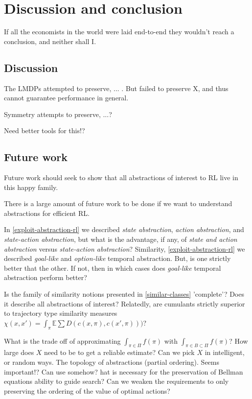 \chapter{Discussion and conclusion}\label{C:con}

If all the economists in the world were laid end-to-end they wouldn't
reach a conclusion, and neither shall I.


\section{Discussion}

The LMDPs attempted to preserve, ... . But failed to preserve X, and thus cannot guarantee performance in general.

Symmetry attempts to preserve, ...?

Need better tools for this!?


\section{Future work}

Future work should seek to show that all abstractions of interest to RL live in this happy family.

There is a large amount of future work to be done if we want to understand abstractions for efficient RL.

In \ref{exploit-abstraction-rl} we described \textit{state abstraction}, \textit{action abstraction}, and \textit{state-action abstraction}, but what is the advantage, if any, of \textit{state and action abstraction} versus \textit{state-action abstraction}? Similarity, \ref{exploit-abstraction-rl} we described \textit{goal-like} and \textit{option-like} temporal abstraction. But, is one strictly better that the other. If not, then in which cases does \textit{goal-like} temporal abstraction perform better?

Is the family of similarity notions presented in \ref{similar-classes} 'complete'? Does it describe all abstractions of interest?
Relatedly, are cumulants strictly superior to trajectory type similarity measures $\chi(x, x') = \int_\pi \mathbb E \sum D(c(x, \pi), c(x', \pi)))$?

What is the trade off of approximating $\int_{\pi \in \Pi}f(\pi)$ with $\int_{\pi \in B \subset \Pi}f(\pi)$?
How large does $X$ need to be to get a reliable estimate? Can we pick $X$ in intelligent, or random ways.
The topology of abstractions (partial ordering). Seems important!? Can use somehow?
hat is necessary for the preservation of Bellman equations ability to guide search? Can we weaken the requirements to only preserving the ordering of the value of optimal actions?

